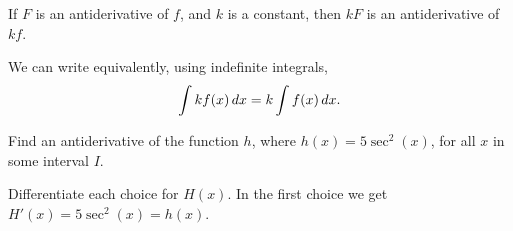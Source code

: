 \documentclass{ximera}
\begin{document}

\begin{theorem}\label{theorem:CMRA}
If $F$ is an antiderivative of $f$, and $k$ is a constant, then $kF$
is an antiderivative of $kf$.

We can write equivalently, using indefinite integrals, 
\[\int kf(x) \mathop{}\!d x= k\int f(x)\mathop{}\!d x.\]
\end{theorem}

\begin{example}
  Find  an antiderivative of the function $h$, where
   $h(x)=5\sec^{2}(x)$,  for all $x$ in some interval $I$.
  \begin{multipleChoice}
  \end{multipleChoice}
  \begin{feedback}
    Differentiate each choice for $H(x)$. In the first choice we get
    $H'(x)=5\sec^{2}(x)=h(x)$.
  \end{feedback}
\end{example}

%
%
%
%  



%
%
%
\end{document}
